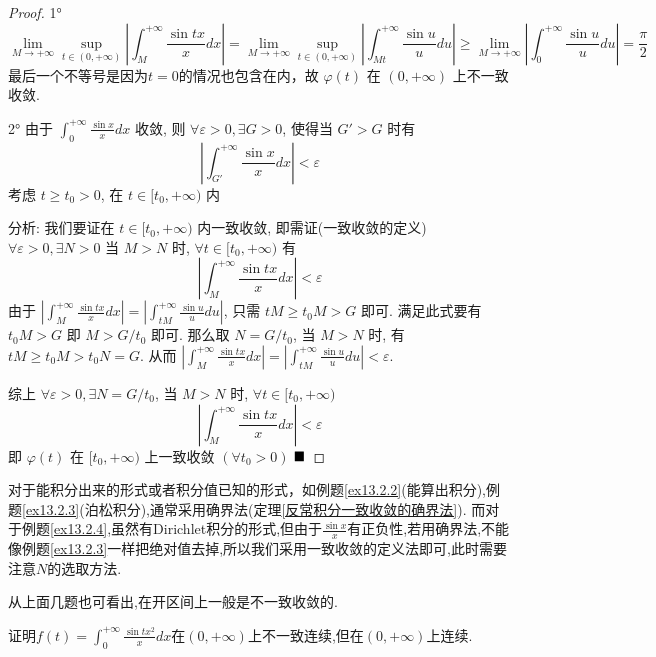 \documentclass[lang=cn,newtx,10pt,scheme=chinese]{elegantbook}
\begin{document}
\begin{proof}
1°
$$ \lim\limits_{M \to +\infty} \sup_{t \in (0, +\infty)} \left| \int_M^{+\infty} \frac{\sin tx}{x} dx \right| = \lim\limits_{M \to +\infty} \sup_{t \in (0, +\infty)} \left| \int_{Mt}^{+\infty} \frac{\sin u}{u} du \right| \ge \lim_{M \to +\infty} \left| \int_0^{+\infty} \frac{\sin u}{u} du \right| = \frac{\pi}{2} $$
最后一个不等号是因为$t=0$的情况也包含在内，故 $\varphi(t)$ 在 $(0, +\infty)$ 上不一致收敛.

2° 由于 $\int_0^{+\infty} \frac{\sin x}{x} dx$ 收敛, 则 $\forall \varepsilon > 0, \exists G > 0$, 使得当 $G' > G$ 时有
$$ \left| \int_{G'}^{+\infty} \frac{\sin x}{x} dx \right| < \varepsilon $$
考虑 $t \ge t_0 > 0$, 在 $t \in [t_0, +\infty)$ 内

分析: 我们要证在 $t \in [t_0, +\infty)$ 内一致收敛, 即需证(一致收敛的定义) $\forall \varepsilon > 0, \exists N > 0$ 当 $M > N$ 时, $\forall t \in [t_0, +\infty)$
有 $$\left| \int_M^{+\infty} \frac{\sin tx}{x} dx \right| < \varepsilon$$ 由于 $\left| \int_M^{+\infty} \frac{\sin tx}{x} dx \right| = \left| \int_{tM}^{+\infty} \frac{\sin u}{u} du \right|$, 只需 $tM \ge t_0 M > G$ 即可.
满足此式要有 $t_0 M > G$ 即 $M > G/t_0$ 即可. 那么取 $N = G/t_0$, 当 $M > N$ 时, 有 $tM \ge t_0 M > t_0 N = G$.
从而 $\left| \int_M^{+\infty} \frac{\sin tx}{x} dx \right| = \left| \int_{tM}^{+\infty} \frac{\sin u}{u} du \right| < \varepsilon$.

综上 $\forall \varepsilon > 0, \exists N = G/t_0$, 当 $M > N$ 时, $\forall t \in [t_0, +\infty)$
$$ \left| \int_M^{+\infty} \frac{\sin tx}{x} dx \right| < \varepsilon $$
即  $\varphi(t)$ 在 $[t_0, +\infty)$ 上一致收敛 $ (\forall t_0 > 0)$
$\hfill \blacksquare$
\end{proof}

\begin{note}
    对于能积分出来的形式或者积分值已知的形式，如例题\ref{ex13.2.2}(能算出积分),例题\ref{ex13.2.3}(泊松积分),通常采用确界法(定理\ref{反常积分一致收敛的确界法}).
    而对于例题\ref{ex13.2.4},虽然有Dirichlet积分的形式,但由于$\frac{\sin x}{x}$有正负性,若用确界法,不能像例题\ref{ex13.2.3}一样把绝对值去掉,所以我们采用一致收敛的定义法即可,此时需要注意$N$的选取方法.

    从上面几题也可看出,在开区间上一般是不一致收敛的.
\end{note}

\begin{problem}[变形]
    证明$f(t) = \int_{0}^{+\infty} \frac{\sin tx^2}{x} dx$在$(0,+\infty)$上不一致连续,但在$(0,+\infty)$上连续.
\end{problem}
\end{document}
